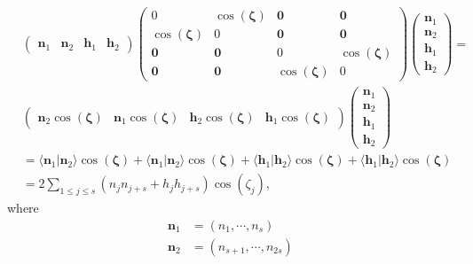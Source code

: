\documentclass[aps, preprint]{revtex4}
\begin{document}
\begin{align} & \left (\begin{array}{cccc}\mathbf{n}_{1} & \mathbf{n}_{2} & \mathbf{h}_{1} & \mathbf{h}_{2}\end{array}\right ) \left (\begin{array}{cccc}0 & \cos  \left (\mathbf{\zeta }\right ) & \mathbf{0} & \mathbf{0} \\
\cos  \left (\mathbf{\zeta }\right ) & 0 & \mathbf{0} & \mathbf{0} \\
\mathbf{0} & \mathbf{0} & 0 & \cos  \left (\mathbf{\zeta }\right ) \\
\mathbf{0} & \mathbf{0} & \cos  \left (\mathbf{\zeta }\right ) & 0\end{array}\right ) \left (\begin{array}{c}\mathbf{n}_{1} \\
\mathbf{n}_{2} \\
\mathbf{h}_{1} \\
\mathbf{h}_{2}\end{array}\right ) = \\
 & \left (\begin{array}{cccc}\mathbf{n}_{2} \cos  \left (\mathbf{\zeta }\right ) & \mathbf{n}_{1} \cos  \left (\mathbf{\zeta }\right ) & \mathbf{h}_{2} \cos  \left (\mathbf{\zeta }\right ) & \mathbf{h}_{1} \cos  \left (\mathbf{\zeta }\right )\end{array}\right ) \left (\begin{array}{c}\mathbf{n}_{1} \\
\mathbf{n}_{2} \\
\mathbf{h}_{1} \\
\mathbf{h}_{2}\end{array}\right ) \\
 &  = \langle \mathbf{n}_{1}\left \vert \mathbf{n}_{2}\right . \rangle  \cos  \left (\mathbf{\zeta }\right ) + \langle \mathbf{n}_{1}\left \vert \mathbf{n}_{2}\right . \rangle  \cos  \left (\mathbf{\zeta }\right ) + \langle \mathbf{h}_{1}\left \vert \mathbf{h}_{2}\right . \rangle  \cos  \left (\mathbf{\zeta }\right ) + \langle \mathbf{h}_{1}\left \vert \mathbf{h}_{2}\right . \rangle  \cos  \left (\mathbf{\zeta }\right ) \\
 &  =2 \sum _{1 \leq j \leq s}\left (n_{j} n_{j +s} +h_{j} h_{j +s}\right ) \cos  \left (\zeta _{j}\right )\text{,}\end{align}where
\begin{align}\mathbf{n}_{1} &  =\left (n_{1} ,\cdots  ,n_{s}\right ) \\
\mathbf{n}_{2} &  =\left (n_{s +1} ,\cdots  ,n_{2 s}\right )\end{align}
\end{document}
